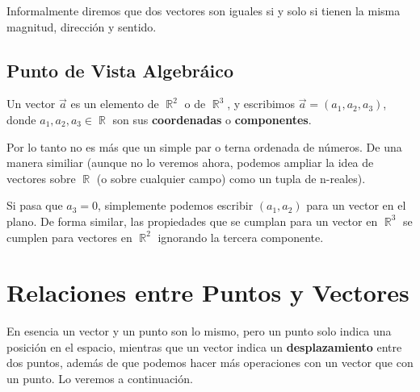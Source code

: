 \documentclass[12pt, fleqn]{report}                             %
\theoremstyle{break}                                            %
\DeclareMathOperator \Reals        {\mathbb{R}}                 %
\begin{document}
                Informalmente diremos que dos vectores son iguales si y solo si tienen la misma
                magnitud, dirección y sentido.
                
            \subsection{Punto de Vista Algebráico}
            
                Un vector $\vec{a}$ es un elemento de $\Reals^2$ o de $\Reals^3$, y escribimos
                $\vec{a} = (a_1, a_2, a_3)$, donde $a_1, a_2, a_3 \in \Reals$ son sus
                \textbf{coordenadas} o \textbf{componentes}.

                Por lo tanto no es más que un simple par o terna ordenada de números. 
                De una manera similiar (aunque no lo veremos ahora, podemos ampliar la idea de vectores
                sobre $\Reals$ (o sobre cualquier campo) como un tupla de n-reales).

                Si pasa que $a_3 = 0$, simplemente podemos escribir $(a_1, a_2)$ para un vector en el plano.
                De forma similar, las propiedades que se cumplan para un vector en $\Reals^3$ se
                cumplen para vectores en $\Reals^2$ ignorando la tercera componente.

            
        \clearpage
        \section{Relaciones entre Puntos y Vectores}
        
            En esencia un vector y un punto son lo mismo, pero un punto solo indica una posición
            en el espacio, mientras que un vector indica un \textbf{desplazamiento} entre dos puntos, además
            de que podemos hacer más operaciones con un vector que con un punto.
            Lo veremos a continuación.
            
\end{document}
